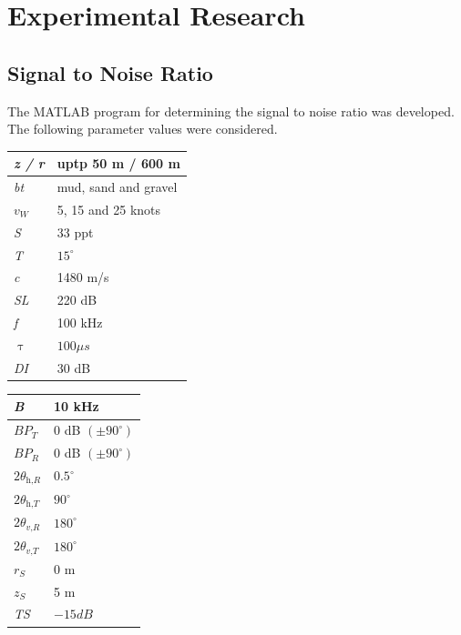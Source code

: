 \chapter*{Experimental Research}


\section{ Signal to Noise Ratio } \label{ Signal to Noise Ratio } 
\noindent  The MATLAB program for determining the signal to noise ratio was developed. The following parameter values were considered.

\begin{minipage}[b]{.40\textwidth}
   \centering
   \begin{tabular}{ | l | l |}
     \hline
     \textit{z / r} & uptp 50 m / 600 m \\ \hline
     \textit{bt} & mud, sand and gravel \\ \hline
     \textit{$v_{W}$} & 5, 15 and 25 knots \\ \hline
     \textit{S} & 33 ppt \\ \hline
     \textit{T} & $15^{\circ}$ \\ \hline
     \textit{c} & 1480 m/s \\ \hline
     \textit{SL} & 220 dB \\ \hline
     \textit{f} & 100 kHz \\ \hline
      $ \uptau $& $100 \mu s $\\ \hline
      \textit{DI} & 30 dB \\
     \hline
   \end{tabular}
  \end{minipage}\qquad
\begin{minipage}[b]{.40\textwidth}
   \centering
   \begin{tabular}{ | l | l |}
     \hline
      \textit{B} & 10 kHz \\ \hline
     \textit{$BP_{T}$} & 0 dB $(\pm 90^{\circ})$ \\ \hline
     \textit{$BP_{R}$} & 0 dB $(\pm 90^{\circ})$\\ \hline
     $2\theta_{\textit{h,R}} $ & $0.5^{\circ}$\\ \hline
     $2\theta_{\textit{h,T}} $ & $90^{\circ}$ \\ \hline
     $2\theta_{\textit{v,R}} $ & $180^{\circ}$ \\ \hline
     $2\theta_{\textit{v,T}} $ & $180^{\circ}$ \\ \hline
     \textit{$r_{S}$} & 0 m \\ \hline
      \textit{$z_{S}$} & 5 m \\ \hline
       \textit{TS} & $ -15 dB$ \\
   \hline
   \end{tabular}
   \end{minipage}
   \newpage
   
